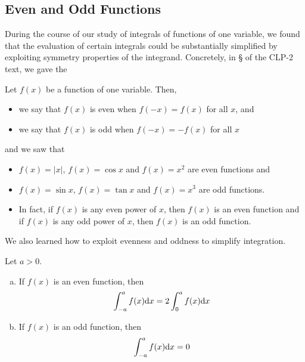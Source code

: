 \subsection{Even and Odd Functions}
\label{sec int symmetry}

During the course of our study of integrals of functions of one variable,
we found that the evaluation of certain integrals could be substantially simplified by exploiting symmetry properties of the integrand. Concretely,
in \S{} of the CLP-2 text, we gave the
\begin{defn}\label{def_evenodd_one_variable}
  Let $f(x)$ be a function of one variable. Then,
 \begin{itemize}
  \item we say that $f(x)$ is even when $f(-x)=f(x)$ for all $x$, and
  \item we say that $f(x)$ is odd when $f(-x)=-f(x)$ for all $x$
 \end{itemize}
\end{defn}
and we saw that 
\begin{itemize}
\item 
$f(x)=|x|$, $f(x)=\cos x$ and $f(x)=x^2$ are even functions and
\item
$f(x)=\sin x$, $f(x)=\tan x$ and  $f(x)=x^3$ are odd functions.
\item
In fact, if $f(x)$ is any even power of $x$, then $f(x)$ is an
even function and if $f(x)$ is any odd power of $x$, then $f(x)$ is
         an odd function.
\end{itemize}
We also learned how to exploit evenness and oddness to simplify integration.
\begin{theorem}
\label{thm:INTevenodd}
Let $a>0$.
\begin{enumerate}[(a)]
\item If $f(x)$ is an even function, then
\begin{align*}
\int_{-a}^a f(x) \mathrm{d}x = 2\int_0^a f(x) \mathrm{d}x
\end{align*}
\item If $f(x)$ is an odd function, then
\begin{align*}
\int_{-a}^a f(x) \mathrm{d}x = 0
\end{align*}
\end{enumerate}
\end{theorem}

